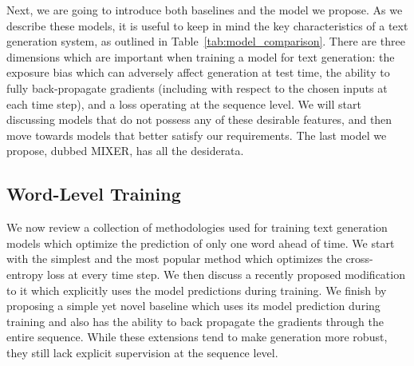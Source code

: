 \documentclass{article} \usepackage{iclr2016_conference,times}
\begin{document}
Next, we are going to introduce both baselines and the model we propose. As we describe these models, it is useful to keep in mind the key characteristics of a text generation system, as outlined in Table~\ref{tab:model_comparison}. There are three dimensions which are important when training a model for text generation: the exposure bias which can adversely affect generation at test time, the ability to fully back-propagate gradients (including with respect to the chosen inputs at each time step), and a loss operating at the sequence level. 
 We will start discussing models that do not possess any of these desirable features, and then move towards models that better satisfy our requirements. The last model we propose, dubbed MIXER, has all the desiderata.

\subsection{Word-Level Training}
We now review a collection of methodologies used for training text generation models which 
optimize the prediction of only one word ahead of time. 
We start with the simplest and the most popular method which optimizes the cross-entropy 
loss at every time step. We then discuss a recently proposed modification to it 
which explicitly uses the model predictions during training. 
We finish by proposing a simple yet novel baseline which uses its model prediction during 
training and also has the ability to back propagate the gradients through the entire sequence. 
While these extensions tend to make generation more robust, 
they still lack explicit supervision at the sequence level. 
\end{document}
